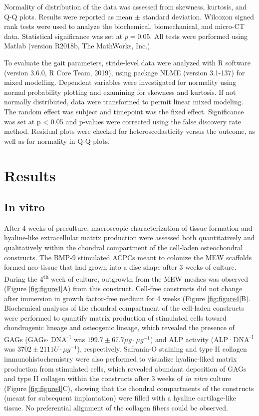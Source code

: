 \documentclass[twocolumn, serif, empirical, authordate, seplic]{jote-article}
\begin{document}
Normality of distribution of the data was assessed from skewness, kurtosis, and Q-Q plots. Results were reported as mean $\pm$ standard deviation. Wilcoxon signed rank tests were used to analyze the biochemical, biomechanical, and micro-CT data. Statistical significance was set at $p = 0.05$. All tests were performed using Matlab (version R2018b, The MathWorks, Inc.).

To evaluate the gait parameters, stride-level data were analyzed with R software (version 3.6.0, R Core Team, 2019), using package NLME (version 3.1-137) for mixed modelling. Dependent variables were investigated for normality using normal probability plotting and examining for skewness and kurtosis. If not normally distributed, data were transformed to permit linear mixed modeling. The random effect was subject and timepoint was the fixed effect. Significance was set at p \textless{}
0.05 and p-values were corrected using the false discovery rate method. Residual plots were checked for heteroscedasticity versus the outcome, as well as for normality in Q-Q plots.

 {}\section*{Results} 

 {}\subsection*{In vitro} 

After 4 weeks of preculture, macroscopic characterization of tissue formation and hyaline-like extracellular matrix production were assessed both quantitatively and qualitatively within the chondral compartment of the cell-laden osteochondral constructs. The BMP-9 stimulated ACPCs meant to colonize the MEW scaffolds formed neo-tissue that had grown into a disc shape after 3 weeks of culture. During the 4\textsuperscript{th} week of culture, outgrowth from the MEW meshes was observed (Figure \ref{fig:figure4}A) from this construct. Cell-free constructs did not change after immersion in growth factor-free medium for 4 weeks (Figure \ref{fig:figure4}B). Biochemical analyses of the chondral compartment of the cell-laden constructs were performed to quantify matrix production of stimulated cells toward chondrogenic lineage and osteogenic lineage, which revealed the presence of GAGs (GAGs$\cdot$ DNA\textsuperscript{-1} was $199.7 \pm 67.7 \mu g\cdot \mu g^{-1}$) and ALP activity (ALP·DNA\textsuperscript{-1} was $3702 \pm 2111 U\cdot\mu g^{-1}$), respectively. Safranin-O staining and type II collagen immunohistochemistry were also performed to visualize hyaline-liked matrix production from stimulated cells, which revealed abundant deposition of GAGs and type II collagen within the constructs after 3 weeks of \emph{in vitro} culture (Figure \ref{fig:figure4}C), showing that the chondral compartments of the constructs (meant for subsequent implantation) were filled with a hyaline cartilage-like tissue. No preferential alignment of the collagen fibers could be observed.
\end{document}
